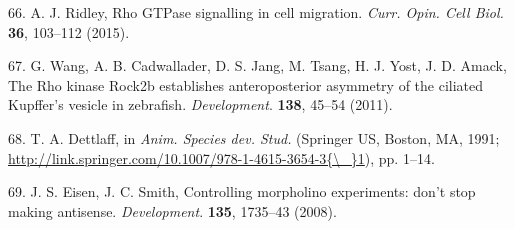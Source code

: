 \documentclass[11pt,singlespacinge,twoside]{reedthesis} %
\begin{document}
\leavevmode\hypertarget{ref-Ridley2015}{}%
66. A. J. Ridley, Rho GTPase signalling in cell migration. \emph{Curr. Opin. Cell Biol.} \textbf{36}, 103--112 (2015).

\leavevmode\hypertarget{ref-Wang2011}{}%
67. G. Wang, A. B. Cadwallader, D. S. Jang, M. Tsang, H. J. Yost, J. D. Amack, The Rho kinase Rock2b establishes anteroposterior asymmetry of the ciliated Kupffer's vesicle in zebrafish. \emph{Development}. \textbf{138}, 45--54 (2011).

\leavevmode\hypertarget{ref-Dettlaff1991}{}%
68. T. A. Dettlaff, in \emph{Anim. Species dev. Stud.} (Springer US, Boston, MA, 1991; \href{http://link.springer.com/10.1007/978-1-4615-3654-3\%7B/_\%7D1}{http://link.springer.com/10.1007/978-1-4615-3654-3\{\textbackslash{}\_\}1}), pp. 1--14.

\leavevmode\hypertarget{ref-Eisen2008b}{}%
69. J. S. Eisen, J. C. Smith, Controlling morpholino experiments: don't stop making antisense. \emph{Development}. \textbf{135}, 1735--43 (2008).


\end{document}
